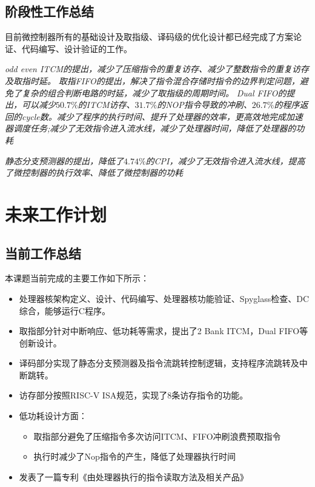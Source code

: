 \documentclass[a4paper, 12pt]{article}
\begin{document}
\subsection{阶段性工作总结}
  目前微控制器所有的基础设计及取指级、译码级的优化设计都已经完成了方案论证、代码编写、设计验证的工作。

    \textit{odd even ITCM的提出，减少了压缩指令的重复访存、减少了整数指令的重复访存及取指时延。}
    \textit{取指FIFO的提出，解决了指令混合存储时指令的边界判定问题，避免了复杂的组合判断电路的时延，减少了取指级的周期时间。}
    \textit{Dual FIFO的提出，可以减少$50.7\%$的ITCM访存、$31.7\%$的NOP指令导致的冲刷、$26.7\%$的程序返回的cycle数。减少了程序的执行时间、提升了处理器的效率，更高效地完成加速器调度任务;减少了无效指令进入流水线，减少了处理器时间，降低了处理器的功耗\cite{9613880}}

  \textit{静态分支预测器的提出，降低了$4.74\%$的CPI，减少了无效指令进入流水线，提高了微控制器的执行效率、降低了微控制器的功耗}

\clearpage
\section{未来工作计划}%
\subsection{当前工作总结}

本课题当前完成的主要工作如下所示：
\begin{itemize}
  \item 处理器核架构定义、设计、代码编写、处理器核功能验证、Spyglass检查、DC综合，能够运行C程序。
  \item 取指部分针对中断响应、低功耗等需求，提出了2 Bank ITCM，Dual FIFO等创新设计。
  \item 译码部分实现了静态分支预测器及指令流跳转控制逻辑，支持程序流跳转及中断跳转。
  \item 访存部分按照RISC-V ISA规范，实现了8条访存指令的功能。
  \item 低功耗设计方面：
  \begin{itemize}
    \item 取指部分避免了压缩指令多次访问ITCM、FIFO冲刷浪费预取指令
    \item 执行时减少了Nop指令的产生，降低了处理器执行时间
  \end{itemize}
  \item 发表了一篇专利《由处理器执行的指令读取方法及相关产品》
\end{itemize}
\end{document}
